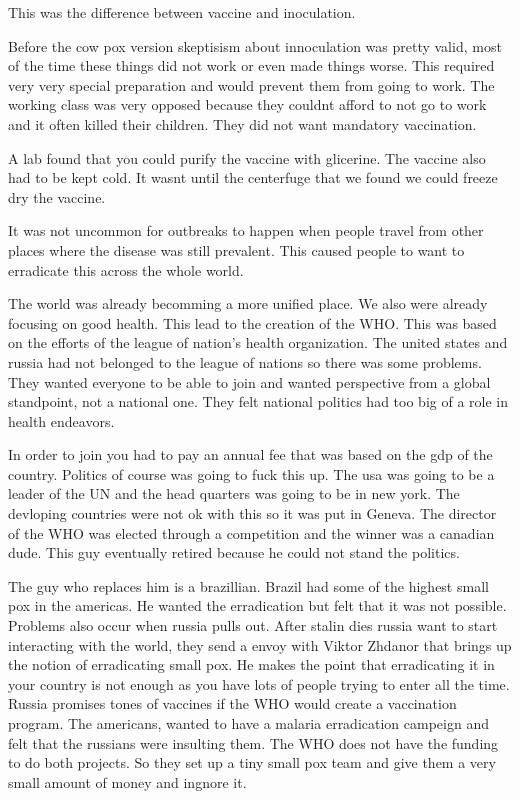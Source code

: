 \documentclass{article}
\begin{document}
This was the difference between vaccine and inoculation.

Before the cow pox version skeptisism about innoculation was pretty valid, most of the time these things did not work or even made things worse. This required very very special preparation and would prevent them from going to work. The working class was very opposed because they couldnt afford to not go to work and it often killed their children. They did not want mandatory vaccination.

A lab found that you could purify the vaccine with glicerine. The vaccine also had to be kept cold. It wasnt until the centerfuge that we found we could freeze dry the vaccine.

It was not uncommon for outbreaks to happen when people travel from other places where the disease was still prevalent. This caused people to want to erradicate this across the whole world.

The world was already becomming a more unified place. We also were already focusing on good health. This lead to the creation of the WHO. This was based on the efforts of the league of nation's health organization. The united states and russia had not belonged to the league of nations so there was some problems. They wanted everyone to be able to join and wanted perspective from a global standpoint, not a national one. They felt national politics had too big of a role in health endeavors.

In order to join you had to pay an annual fee that was based on the gdp of the country. Politics of course was going to fuck this up. The usa was going to be a leader of the UN and the head quarters was going to be in new york. The devloping countries were not ok with this so it was put in Geneva. The director of the WHO was elected through a competition and the winner was a canadian dude. This guy eventually retired because he could not stand the politics.

The guy who replaces him is a brazillian. Brazil had some of the highest small pox in the americas. He wanted the erradication but felt that it was not possible. Problems also occur when russia pulls out. After stalin dies russia want to start interacting with the world, they send a envoy with Viktor Zhdanor that brings up the notion of erradicating small pox. He makes the point that erradicating it in your country is not enough as you have lots of people trying to enter all the time. Russia promises tones of vaccines if the WHO would create a vaccination program. The americans, wanted to have a malaria erradication campeign and felt that the russians were insulting them. The WHO does not have the funding to do both projects. So they set up a tiny small pox team and give them a very small amount of money and ingnore it.
\end{document}
